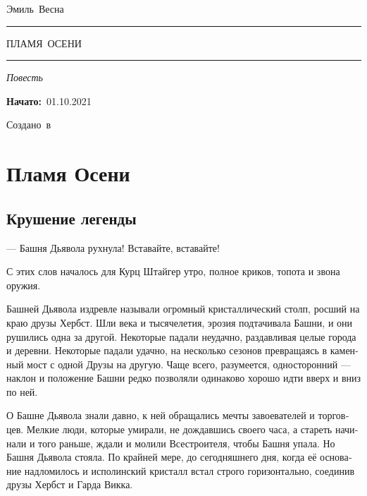 \documentclass[a4paper,12pt,fleqn]{book}\usepackage{polyglossia}\setdefaultlanguage[babelshorthands=true]{russian}\setotherlanguage{english}\defaultfontfeatures{Ligatures=TeX,Mapping=tex-text}\usepackage{xcolor}\newcommand{\ml}[3]{#2}
\newcommand{\tofaauthor}{\ml{$0$}{Эмиль~Весна}{Emil~Viesn\'{a}}}
\newcommand{\tofatitle}{\ml{$0$}{ПЛАМЯ~ОСЕНИ}{Flame~of~the~Fall}}
\newcommand{\tofastarted}{01.10.2021}
\newcommand{\asterism}{\vspace{1em}{\centering\Large\bfseries$\ast~\ast~\ast$\par}\vspace{1em}}
\begin{document}

\begin{titlepage}
{\centering{~\par}\vspace{0.25\textheight}
{\LARGE\tofaauthor}\par
\vspace{1.0cm}\rule{17em}{1pt}\par\vspace{0.3cm}
{\Huge\textsc{\tofatitle}\par}
\vspace{0.3cm}\rule{17em}{2pt}\par\vspace{1.0cm}
{\Large\textit{\ml{$0$}{Повесть}{Novella}}\par}
\vspace{0.5cm}\asterism\par\vspace{1.0cm}
{\textbf{\ml{$0$}{Начато:}{Started:}}~\tofastarted\par}\vfill
{\Large\ml{$0$}{Создано~в}{Created~by}~\XeLaTeX}\par}
\end{titlepage}

\tableofcontents

\chapter{Пламя Осени}

\section{Крушение легенды}

--- Башня Дьявола рухнула!
Вставайте, вставайте!

С этих слов началось для Курц Штайгер утро, полное криков, топота и звона оружия.

Башней Дьявола издревле называли огромный кристаллический столп, росший на краю друзы Хербст.
Шли века и тысячелетия, эрозия подтачивала Башни, и они рушились одна за другой.
Некоторые падали неудачно, раздавливая целые города и деревни.
Некоторые падали удачно, на несколько сезонов превращаясь в каменный мост с одной Друзы на другую.
Чаще всего, разумеется, односторонний --- наклон и положение Башни редко позволяли одинаково хорошо идти вверх и вниз по ней.

О Башне Дьявола знали давно, к ней обращались мечты завоевателей и торговцев.
Мелкие люди, которые умирали, не дождавшись своего часа, а стареть начинали и того раньше, ждали и молили Всестроителя, чтобы Башня упала.
Но Башня Дьявола стояла.
По крайней мере, до сегодняшнего дня, когда её основание надломилось и исполинский кристалл встал строго горизонтально, соединив друзы Хербст и Гарда Викка.
\end{document}
